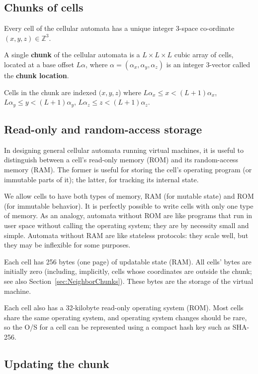 \documentclass{article}
\begin{document}
\subsection{Chunks of cells}

Every cell of the cellular automata has a unique integer 3-space co-ordinate $(x,y,z) \in \mathbb{Z}^3$.

A single {\bf chunk} of the cellular automata is a $L \times L \times L$ cubic array of cells,
located at a base offset $L\alpha$,
where $\alpha = (\alpha_x,\alpha_y,\alpha_z)$ is an integer 3-vector called the {\bf chunk location}.

Cells in the chunk are indexed $(x,y,z$) where
$L\alpha_x \leq x < (L+1)\alpha_x$,
$L\alpha_y \leq y < (L+1)\alpha_y$,
$L\alpha_z \leq z < (L+1)\alpha_z$.

\subsection{Read-only and random-access storage}
\label{sec:Storage}

In designing general cellular automata running virtual machines,
it is useful to distinguish between a cell's read-only memory (ROM)
and its random-access memory (RAM).
The former is useful for storing the cell's operating program (or immutable parts of it); the latter, for tracking its internal state.

We allow cells to have both types of memory, RAM (for mutable state) and ROM (for immutable behavior).
It is perfectly possible to write cells with only one type of memory.
As an analogy, automata without ROM are like programs that run in user space without calling the operating system; they are by necessity small and simple.
Automata without RAM are like stateless protocols: they scale well, but they may be inflexible for some purposes.

Each cell has 256 bytes (one page) of updatable state (RAM).
All cells' bytes are initially zero
(including, implicitly, cells whose coordinates are outside the chunk; see also Section~\ref{sec:NeighborChunks}).
These bytes are the storage of the virtual machine.

Each cell also has a 32-kilobyte read-only operating system (ROM).
Most cells share the same operating system, and operating system changes should be rare,
so the O/S for a cell can be represented using a compact hash key such as SHA-256.

\subsection{Updating the chunk}
\label{sec:UpdatingChunk}
\end{document}
